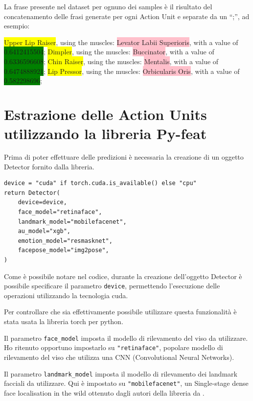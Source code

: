 La frase presente nel dataset per ognuno dei samples è il risultato del concatenamento delle frasi generate per ogni Action Unit e separate da un “;”, ad esempio:

\colorbox{yellow}{Upper Lip Raiser}, using the muscles: \colorbox{pink}{Levator Labii Superioris}, with a value of \colorbox{green}{0.6412415504}; \colorbox{yellow}{Dimpler}, using the muscles: \colorbox{pink}{Buccinator}, with a value of \colorbox{green}{0.6336596608}; \colorbox{yellow}{Chin Raiser}, using the muscles: \colorbox{pink}{Mentalis}, with a value of \colorbox{green}{0.6474888921}; \colorbox{yellow}{Lip Pressor}, using the muscles: \colorbox{pink}{Orbicularis Oris}, with a value of \colorbox{green}{0.582298696};


\section{Estrazione delle Action Units utilizzando la libreria Py-feat}
Prima di poter effettuare delle predizioni è necessaria la creazione di un oggetto Detector fornito dalla libreria.
\begin{verbatim}
device = "cuda" if torch.cuda.is_available() else "cpu"
return Detector(
    device=device,
    face_model="retinaface",
    landmark_model="mobilefacenet",
    au_model="xgb",
    emotion_model="resmasknet",
    facepose_model="img2pose",
)
\end{verbatim}
Come è possibile notare nel codice, durante la creazione dell’oggetto Detector è possibile specificare il parametro \texttt{device}, permettendo l’esecuzione delle operazioni utilizzando la tecnologia cuda. 

Per controllare che sia effettivamente possibile utilizzare questa funzionalità è stata usata la libreria torch per python.

Il parametro \texttt{face_model} imposta il modello di rilevamento del viso da utilizzare. Ho ritenuto opportuno impostarlo su \texttt{"retinaface"}, popolare modello di rilevamento del viso che utilizza una CNN (Convolutional Neural Networks).

Il parametro \texttt{landmark_model} imposta il modello di rilevamento dei landmark facciali da utilizzare. Qui è impostato su \texttt{"mobilefacenet"}, un Single-stage dense face localisation in the wild ottenuto dagli autori della libreria da \cite{Chen2018MobileFaceNets} .

